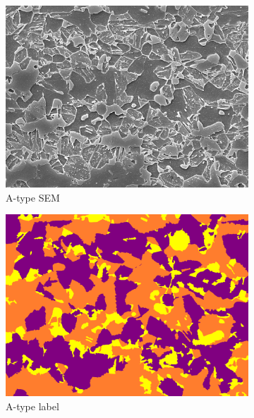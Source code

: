 \documentclass[]{article}
\begin{document}
\begin{figure}[ht]
	\begin{subfigure}[b]{0.2\textwidth}
		\centering
		\includegraphics[width=\textwidth]{images/A-type/1.png}
		\caption{A-type SEM}
		\label{fig:image2.3.1}
	\end{subfigure}
	\begin{subfigure}[b]{0.2\textwidth}
		\centering
		\includegraphics[width=\textwidth]{images/A-type/1_label.png}
		\caption{A-type label}
		\label{fig:image2.3.2}
	\end{subfigure}
	\hfill
	\begin{subfigure}[b]{0.2\textwidth}
		\centering

\end{subfigure}
\end{figure}
\end{document}

